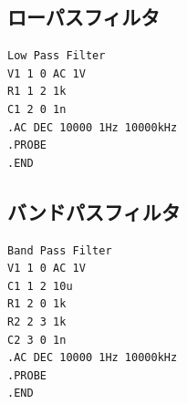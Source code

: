 \documentclass{jlreq}
\numberwithin{equation}{section}
\begin{document}
\subsection{ローパスフィルタ}
\begin{verbatim}
Low Pass Filter
V1 1 0 AC 1V
R1 1 2 1k
C1 2 0 1n
.AC DEC 10000 1Hz 10000kHz
.PROBE
.END
\end{verbatim}

\subsection{バンドパスフィルタ}
\begin{verbatim}
Band Pass Filter
V1 1 0 AC 1V
C1 1 2 10u
R1 2 0 1k
R2 2 3 1k
C2 3 0 1n
.AC DEC 10000 1Hz 10000kHz
.PROBE
.END
\end{verbatim}
\end{document}
